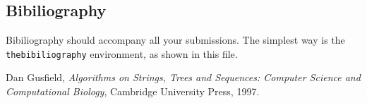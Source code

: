 \documentclass[10pt]{article}
\begin{document}
\subsection*{Bibiliography}

 Bibiliography should accompany all your submissions. The simplest way is the
\texttt{thebibiliography} environment, as shown in this file.


\begin{thebibliography}{999}

 Dan Gusfield, \textit{Algorithms on Strings, Trees and Sequences: Computer Science
and Computational Biology},  Cambridge University Press, 1997.

\end{thebibliography}
\end{document}
